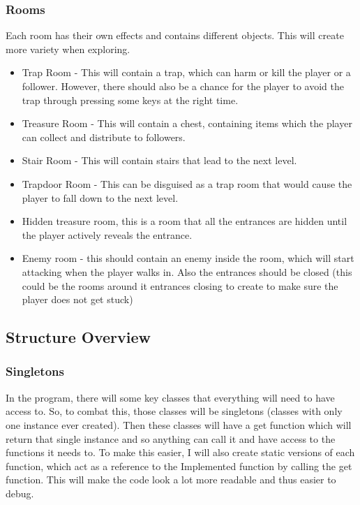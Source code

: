 \documentclass[../Main.tex]{subfiles}
\begin{document}
        \subsubsection{Rooms}
            Each room has their own effects and contains different objects. This will create more variety when exploring.
            \begin{itemize}
                \item Trap Room - This will contain a trap, which can harm or kill the player or a follower. However, there should also be a chance for the player to avoid the trap through pressing some keys at the right time.
                \item Treasure Room - This will contain a chest, containing items which the player can collect and distribute to followers.
                \item Stair Room - This will contain stairs that lead to the next level.
                \item Trapdoor Room - This can be disguised as a trap room that would cause the player to fall down to the next level.
                \item Hidden treasure room, this is a room that all the entrances are hidden until the player actively reveals the entrance.
                \item Enemy room - this should contain an enemy inside the room, which will start attacking when the player walks in. Also the entrances should be closed (this could be the rooms around it entrances closing to create to make sure the player does not get stuck)
            \end{itemize}
    \subsection{Structure Overview}
        \subsubsection{Singletons}
            In the program, there will some key classes that everything will need to have access to. So, to combat this, those classes will be singletons (classes with only one instance ever created). Then these classes will have a get function which will return that single instance and so anything can call it and have access to the functions it needs to. To make this easier, I will also create static versions of each function, which act as a reference to the Implemented function by calling the get function. This will make the code look a lot more readable and thus easier to debug.
\end{document}

